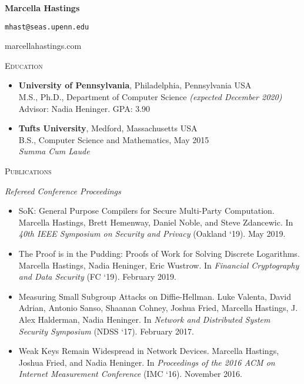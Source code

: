 \documentclass{article}
\newcommand{\textbox}[1]{\parbox{.333\textwidth}{#1}}
\begin{document}
\pagestyle{empty}
\noindent\textbox{\textbf{Marcella Hastings}\hfill}\textbox{\centering \texttt{mhast@seas.upenn.edu}}\textbox{\hfill marcellahastings.com}

\hrulefill

\textsc{Education}
\begin{itemize}[label={}]
  \item \textbf{University of Pennsylvania}, Philadelphia, Pennsylvania USA \\
    M.S., Ph.D., Department of Computer Science \textit{(expected December 2020)}\\
    Advisor: Nadia Heninger. GPA: 3.90
    
  \item \textbf{Tufts University}, Medford, Massachusetts USA \\
    B.S., Computer Science and Mathematics, May 2015 \\
    \textit{Summa Cum Laude}
\end{itemize}

\textsc{Publications}

\textit{Refereed Conference Proceedings}
\begin{itemize}[label={}]
\item SoK: General Purpose Compilers for Secure Multi-Party Computation. 
Marcella Hastings, Brett Hemenway, Daniel Noble, and Steve Zdancewic.
In \textit{40th IEEE Symposium on Security and Privacy} (Oakland `19). May 2019.
\item The Proof is in the Pudding: Proofs of Work for Solving Discrete Logarithms.
Marcella Hastings, Nadia Heninger, Eric Wustrow.
In \emph{Financial Cryptography and Data Security} (FC `19). February 2019.
\item Measuring Small Subgroup Attacks on Diffie-Hellman. 
Luke Valenta, David Adrian, Antonio Sanso, Shaanan Cohney, Joshua Fried, Marcella Hastings, J. Alex Halderman, Nadia Heninger. 
In \textit{Network and Distributed System Security Symposium} (NDSS `17). February 2017.
\item Weak Keys Remain Widespread in Network Devices. 
Marcella Hastings, Joshua Fried, and Nadia Heninger. 
In \textit{Proceedings of the 2016 ACM on Internet Measurement Conference} (IMC `16). November 2016.
\end{itemize}
\end{document}

